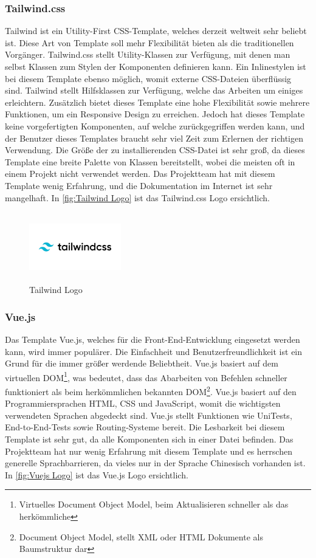 \newpage
\subsubsection{Tailwind.css}
Tailwind ist ein Utility-First CSS-Template, welches derzeit weltweit sehr beliebt ist. Diese Art von Template soll mehr Flexibilität bieten als die traditionellen Vorgänger. Tailwind.css stellt Utility-Klassen zur Verfügung, mit denen man selbst Klassen zum Stylen der Komponenten definieren kann. Ein Inlinestylen ist bei diesem Template ebenso möglich, womit externe CSS-Dateien überflüssig sind. Tailwind stellt Hilfsklassen zur Verfügung, welche das Arbeiten um einiges erleichtern. Zusätzlich bietet dieses Template eine hohe Flexibilität sowie mehrere Funktionen, um ein Responsive Design zu erreichen. Jedoch hat dieses Template keine vorgefertigten Komponenten, auf welche zurückgegriffen werden kann, und der Benutzer dieses Templates braucht sehr viel Zeit zum Erlernen der richtigen Verwendung. Die Größe der zu installierenden CSS-Datei ist sehr groß, da dieses Template eine breite Palette von Klassen bereitstellt, wobei die meisten oft in einem Projekt nicht verwendet werden. Das Projektteam hat mit diesem Template wenig Erfahrung, und die Dokumentation im Internet ist sehr mangelhaft.
 In \autoref{fig:Tailwind Logo}
ist das Tailwind.css Logo ersichtlich.
\begin{figure}[h]
	\centering
	\includegraphics[height=3cm,width=4cm]{images/Tailwind}
	\caption{Tailwind Logo}
	\label{fig:Tailwind Logo}
\end{figure}


\subsubsection{Vue.js}\label{sec: Vue.js}
Das Template Vue.js, welches für die Front-End-Entwicklung eingesetzt werden kann, wird immer populärer. Die Einfachheit und Benutzerfreundlichkeit ist ein Grund für die immer größer werdende Beliebtheit. Vue.js basiert auf dem virtuellen DOM\footnote{Virtuelles Document Object Model, beim Aktualisieren schneller als das herkömmliche}, was bedeutet, dass das Abarbeiten von Befehlen schneller funktioniert als beim herkömmlichen bekannten DOM\footnote{Document Object Model, stellt XML oder HTML Dokumente als Baumstruktur dar}. Vue.js basiert auf den Programmiersprachen HTML, CSS und JavaScript, womit die wichtigsten verwendeten Sprachen abgedeckt sind. Vue.js stellt Funktionen wie UniTests, End-to-End-Tests sowie Routing-Systeme bereit. Die Lesbarkeit bei diesem Template ist sehr gut, da alle Komponenten sich in einer Datei befinden. Das Projektteam hat nur wenig Erfahrung mit diesem Template und es herrschen generelle Sprachbarrieren, da vieles nur in der Sprache Chinesisch vorhanden ist.
 In \autoref{fig:Vuejs Logo}
ist das Vue.js Logo ersichtlich.

